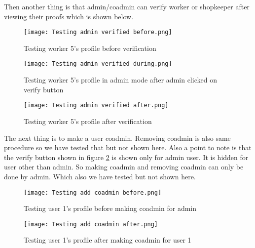 \documentclass[conference]{IEEEtran}
\begin{document}
\begin{itemize}
    Then another thing is that admin/coadmin can verify worker or shopkeeper after viewing their proofs which is shown below.
    \begin{figure}[H]
        \centering
        \texttt{[image: Testing admin verified before.png]}
        \caption{Testing worker 5's profile before verification}
        \label{fig:testAdminVerifiedBefore}
    \end{figure}
    \begin{figure}[H]
        \centering
        \texttt{[image: Testing admin verified during.png]}
        \caption{Testing worker 5's profile in admin mode after admin clicked on verify button}
        \label{fig:testAdminVerifiedDuring}
    \end{figure}
    \begin{figure}[H]
        \centering
        \texttt{[image: Testing admin verified after.png]}
        \caption{Testing worker 5's profile after verification}
        \label{fig:testAdminVerifiedAfter}
    \end{figure}
    
    The next thing is to make a user coadmin. Removing coadmin is also same procedure so we have tested that but not shown here. Also a point to note is that the verify button shown in figure \ref{fig:testAdminVerifiedDuring} is shown only for admin user. It is hidden for user other than admin. So making coadmin and removing coadmin can only be done by admin. Which also we have tested but not shown here.
    \begin{figure}[H]
        \centering
        \texttt{[image: Testing add coadmin before.png]}
        \caption{Testing user 1's profile before making coadmin for admin}
        \label{fig:testAddCoadminBefore}
    \end{figure}
    \begin{figure}[H]
        \centering
        \texttt{[image: Testing add coadmin after.png]}
        \caption{Testing user 1's profile after making coadmin for user 1}
        \label{fig:testAddCoadminAfter}
    \end{figure}
    
    
    
\end{itemize}





\vspace{1cm}
\end{document}
